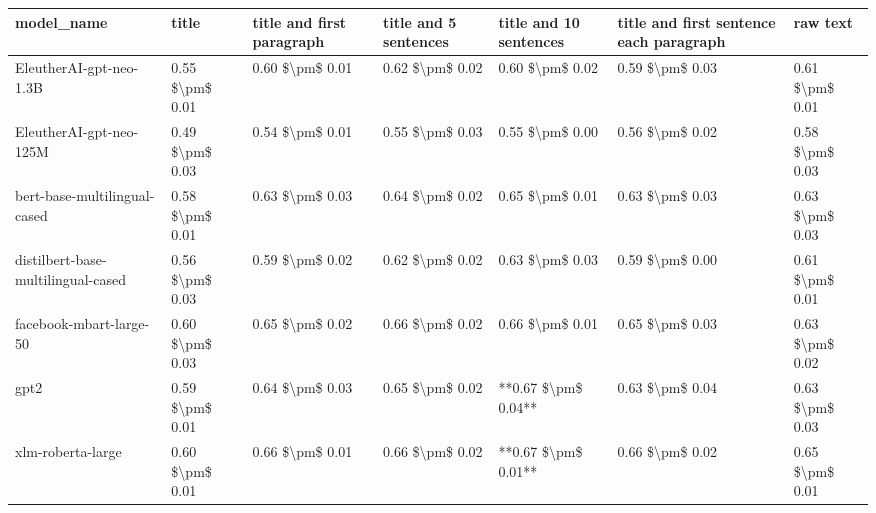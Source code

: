 \begin{tabular}{lllllll}
\toprule
                        model\_name &           title & title and first paragraph & title and 5 sentences & title and 10 sentences & title and first sentence each paragraph &        raw text \\
\midrule
           EleutherAI-gpt-neo-1.3B & 0.55 \$\textbackslash pm\$ 0.01 &           0.60 \$\textbackslash pm\$ 0.01 &       0.62 \$\textbackslash pm\$ 0.02 &        0.60 \$\textbackslash pm\$ 0.02 &                         0.59 \$\textbackslash pm\$ 0.03 & 0.61 \$\textbackslash pm\$ 0.01 \\
           EleutherAI-gpt-neo-125M & 0.49 \$\textbackslash pm\$ 0.03 &           0.54 \$\textbackslash pm\$ 0.01 &       0.55 \$\textbackslash pm\$ 0.03 &        0.55 \$\textbackslash pm\$ 0.00 &                         0.56 \$\textbackslash pm\$ 0.02 & 0.58 \$\textbackslash pm\$ 0.03 \\
      bert-base-multilingual-cased & 0.58 \$\textbackslash pm\$ 0.01 &           0.63 \$\textbackslash pm\$ 0.03 &       0.64 \$\textbackslash pm\$ 0.02 &        0.65 \$\textbackslash pm\$ 0.01 &                         0.63 \$\textbackslash pm\$ 0.03 & 0.63 \$\textbackslash pm\$ 0.03 \\
distilbert-base-multilingual-cased & 0.56 \$\textbackslash pm\$ 0.03 &           0.59 \$\textbackslash pm\$ 0.02 &       0.62 \$\textbackslash pm\$ 0.02 &        0.63 \$\textbackslash pm\$ 0.03 &                         0.59 \$\textbackslash pm\$ 0.00 & 0.61 \$\textbackslash pm\$ 0.01 \\
           facebook-mbart-large-50 & 0.60 \$\textbackslash pm\$ 0.03 &           0.65 \$\textbackslash pm\$ 0.02 &       0.66 \$\textbackslash pm\$ 0.02 &        0.66 \$\textbackslash pm\$ 0.01 &                         0.65 \$\textbackslash pm\$ 0.03 & 0.63 \$\textbackslash pm\$ 0.02 \\
                              gpt2 & 0.59 \$\textbackslash pm\$ 0.01 &           0.64 \$\textbackslash pm\$ 0.03 &       0.65 \$\textbackslash pm\$ 0.02 &    **0.67 \$\textbackslash pm\$ 0.04** &                         0.63 \$\textbackslash pm\$ 0.04 & 0.63 \$\textbackslash pm\$ 0.03 \\
                 xlm-roberta-large & 0.60 \$\textbackslash pm\$ 0.01 &           0.66 \$\textbackslash pm\$ 0.01 &       0.66 \$\textbackslash pm\$ 0.02 &    **0.67 \$\textbackslash pm\$ 0.01** &                         0.66 \$\textbackslash pm\$ 0.02 & 0.65 \$\textbackslash pm\$ 0.01 \\
\bottomrule
\end{tabular}
